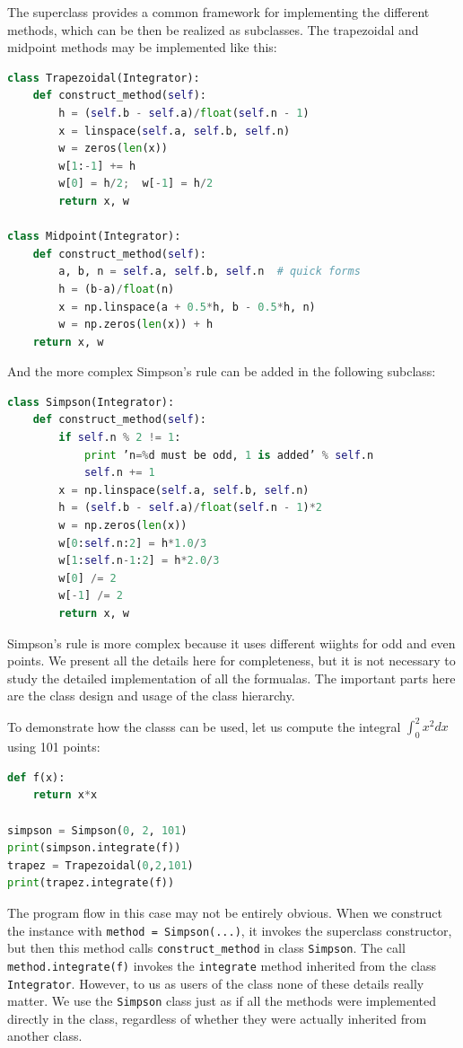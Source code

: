 \documentclass[graybox,envcountchap,sectrefs,final]{svmonodo}
\begin{document}
The superclass provides a common framework for implementing the different methods, which can be
then be realized as subclasses. The trapezoidal and midpoint methods may be implemented like this:
\begin{lstlisting}[language=Python,style=blue1]
class Trapezoidal(Integrator):
    def construct_method(self):
        h = (self.b - self.a)/float(self.n - 1)
        x = linspace(self.a, self.b, self.n)
        w = zeros(len(x))
        w[1:-1] += h
        w[0] = h/2;  w[-1] = h/2
        return x, w

class Midpoint(Integrator):
    def construct_method(self):
        a, b, n = self.a, self.b, self.n  # quick forms
        h = (b-a)/float(n)
        x = np.linspace(a + 0.5*h, b - 0.5*h, n)
        w = np.zeros(len(x)) + h
	return x, w
\end{lstlisting}
And the more complex Simpson's rule can be added in the following subclass:
\begin{lstlisting}[language=Python,style=blue1]
class Simpson(Integrator):
    def construct_method(self):
        if self.n % 2 != 1:
            print ’n=%d must be odd, 1 is added’ % self.n
            self.n += 1
        x = np.linspace(self.a, self.b, self.n)
        h = (self.b - self.a)/float(self.n - 1)*2
        w = np.zeros(len(x))
        w[0:self.n:2] = h*1.0/3
        w[1:self.n-1:2] = h*2.0/3
        w[0] /= 2
        w[-1] /= 2
        return x, w
\end{lstlisting}
Simpson's rule is more complex because it uses different wiights for odd and even points. We
present all the details here for completeness, but it is not necessary to study the detailed
implementation of all the formualas. The important parts here are the class design and usage of
the class hierarchy.

To demonstrate how the classs can be used, let us compute the integral
$\int_0^2 x^2dx$ using 101 points:
\begin{lstlisting}[language=Python,style=blue1]
def f(x):
    return x*x

simpson = Simpson(0, 2, 101)
print(simpson.integrate(f))
trapez = Trapezoidal(0,2,101)
print(trapez.integrate(f))
\end{lstlisting}

The program flow in this case may not be entirely obvious. When we construct the instance
with \texttt{method = Simpson(...)}, it invokes the superclass constructor, but then this method
calls \Verb!construct_method! in class \texttt{Simpson}. The call \texttt{method.integrate(f)} invokes the
\texttt{integrate} method inherited from the class \texttt{Integrator}. However, to us as users of
the class none of these details really matter. We use the \texttt{Simpson} class just as if all
the methods were implemented directly in the class, regardless of whether they were actually
inherited from another class.
\end{document}
